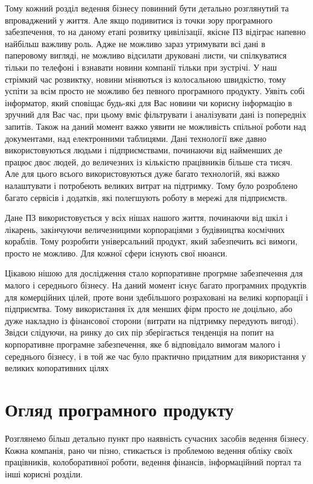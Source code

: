 Тому кожний розділ ведення бізнесу повинний бути детально розглянутий та впроваджений у життя. 
Але якщо подивитися із точки зору програмного забезпечення, то на даному етапі розвитку цивілізації, якісне ПЗ відіграє напевно найбільш важливу роль. 
Адже не можливо зараз утримувати всі дані в паперовому вигляді, не можливо відсилати друковані листи, чи спілкуватися тільки по телефоні і взнавати новини компанії тільки при зустрічі. 
У наш стрімкий час розвиктку, новини міняються із колосальною швидкістю, тому успіти за всім просто не можливо без певного програмного продукту. 
Уявіть собі інформатор, який сповіщає будь-які для Вас новини чи корисну інформацію в зручний для Вас час, при цьому вміє фільтрувати і аналізувати дані із попередніх запитів. 
Також на даний момент важко уявити не можливість спільної роботи над документами, над електронними таблицями. 
Дані технології вже давно використовуються людьми і підприємствами, починаючи від найменших де працює двоє людей, до величезних із кількістю працівників більше ста тисяч. 
Але для цього всього використовуються дуже багато технологій, які важко налаштувати і потробеють великих витрат на підтримку.
Тому було розроблено багато сервісів і додатків, які полегшують роботу в мережі для підприємств.
\par Дане ПЗ використовується у всіх нішах нашого життя, починаючи від шкіл і лікарень, закінчуючи величезницими корпораціями з будівництва космічних кораблів. 
Тому розробити універсальний продукт, який забезпечить всі вимоги, просто не можливо. 
Для кожної сфери існують свої нюанси.
\par Цікавою нішою для дослідження стало корпоративне прогрмне забезпечення для малого і середнього бізнесу.
 На даний момент існує багато програмних продуктів для комерційних цілей, проте вони здебільшого розраховані на великі корпорації і підприємтва.
Тому використання їх для менших фірм просто не доцільно, або дуже накладно із фінансової сторони (витрати на підтримку передують вигоді).
Звідси слідуючи, на ринку до сих пір зберігається тенденція на попит на корпоративне програмне забезпечення, яке б відповідало вимогам малого і середнього бізнесу, і в той же час було практично придатним для використання у великих копоративних цілях

\section{Огляд програмного продукту}
Розглянемо більш детально пункт про наявність сучасних засобів ведення бізнесу. Кожна компанія, рано чи пізно, стикається із проблемою ведення обліку своїх працівників, колоборативної роботи, ведення фінансів, інформаційний портал та інші корисні розділи.







